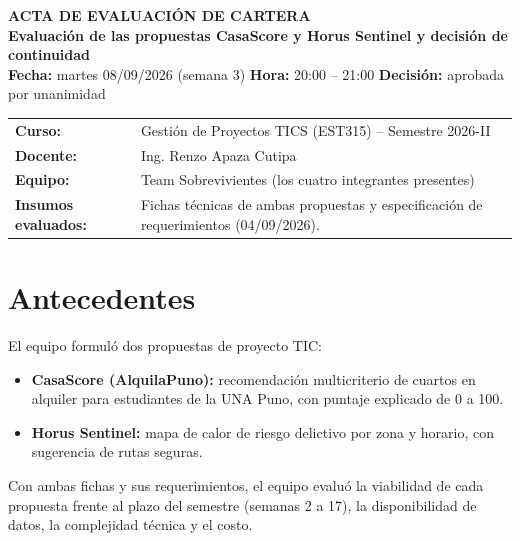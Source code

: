 \documentclass[11pt,a4paper]{article}
\begin{document}

\begin{center}
    {\Large \textbf{\textcolor{AzulUNA}{ACTA DE EVALUACIÓN DE CARTERA}}}\\[3pt]
    {\normalsize \textbf{Evaluación de las propuestas CasaScore y Horus Sentinel y decisión de continuidad}}\\[4pt]
    \footnotesize \textbf{Fecha:} martes 08/09/2026 (semana 3) \quad \textbar\quad \textbf{Hora:} 20:00 -- 21:00 \quad \textbar\quad \textbf{Decisión:} aprobada por unanimidad
\end{center}

\vspace{0.1cm}

\noindent\begin{tabularx}{\textwidth}{@{}P{3.8cm} L@{}}
\toprule
\textbf{Curso:} & Gestión de Proyectos TICS (EST315) -- Semestre 2026-II \\
\textbf{Docente:} & Ing. Renzo Apaza Cutipa \\
\textbf{Equipo:} & Team Sobrevivientes (los cuatro integrantes presentes) \\
\textbf{Insumos evaluados:} & Fichas técnicas de ambas propuestas y especificación de requerimientos (04/09/2026). \\
\bottomrule
\end{tabularx}

\section{Antecedentes}
El equipo formuló dos propuestas de proyecto TIC:
\begin{itemize}[leftmargin=*]
    \item \textbf{CasaScore (AlquilaPuno):} recomendación multicriterio de cuartos en alquiler para estudiantes de la UNA Puno, con puntaje explicado de 0 a 100.
    \item \textbf{Horus Sentinel:} mapa de calor de riesgo delictivo por zona y horario, con sugerencia de rutas seguras.
\end{itemize}
Con ambas fichas y sus requerimientos, el equipo evaluó la viabilidad de cada propuesta frente al plazo del semestre (semanas 2 a 17), la disponibilidad de datos, la complejidad técnica y el costo.
\end{document}
